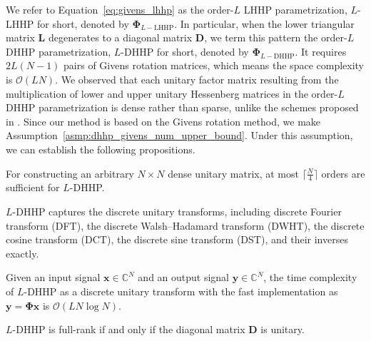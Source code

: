 We refer to Equation~\ref{eq:givens_lhhp} as the order-$L$ LHHP parametrization, $L$-LHHP for short, denoted by $\bm{\Phi}_{L-\text{LHHP}}$. In particular, when the lower triangular matrix $\mathbf{L}$ degenerates to a diagonal matrix $\mathbf{D}$, we term this pattern the order-$L$ DHHP parametrization, $L$-DHHP for short, denoted by $\bm{\Phi}_{L-\text{DHHP}}$. It requires $2L(N-1)$ pairs of Givens rotation matrices, which means the space complexity is $\mathcal{O}(LN)$. We observed that each unitary factor matrix resulting from the multiplication of lower and upper unitary Hessenberg matrices in the order-$L$ DHHP parametrization is dense rather than sparse, unlike the schemes proposed in \citep{KHALITOV2022160}. Since our method is based on the Givens rotation method, we make Assumption~\ref{asmp:dhhp_givens_num_upper_bound}. Under this assumption, we can establish the following propositions.

\begin{assumption}\label{asmp:dhhp_givens_num_upper_bound}
For constructing an arbitrary $N \times N$ dense unitary matrix, at most $\lceil\frac{N}{4}\rceil$ orders are sufficient for $L$-DHHP.
\end{assumption}

\begin{proposition}\label{prop:dhhp_universal}
$L$-DHHP captures the discrete unitary transforms, including discrete Fourier transform (DFT), the discrete Walsh–Hadamard transform (DWHT), the discrete cosine transform (DCT), the discrete sine transform (DST), and their inverses exactly.
\end{proposition}

\begin{proposition}\label{prop:dhhp_time_complexity}
Given an input signal $\mathbf{x} \in \mathbb{C}^{N}$ and an output signal $\mathbf{y} \in \mathbb{C}^{N}$, the time complexity of $L$-DHHP as a discrete unitary transform with the fast implementation as $\mathbf{y} = \bm{\Phi}\mathbf{x}$ is $\mathcal{O}(LN\log{N})$.
\end{proposition}

\begin{proposition}\label{prop:dhhp_full_rank}
$L$-DHHP is full-rank if and only if the diagonal matrix $\mathbf{D}$ is unitary.
\end{proposition}

